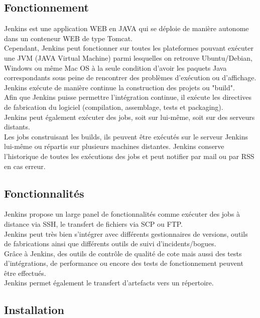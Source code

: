 \documentclass[12pt]{article}
\begin{document}
\subsection{Fonctionnement}

Jenkins est une application WEB en JAVA qui se déploie de manière autonome dans un conteneur WEB de type Tomcat.
\\
Cependant, Jenkins peut fonctionner sur toutes les plateformes pouvant exécuter une JVM (JAVA Virtual Machine) parmi lesquelles on retrouve Ubuntu/Debian, Windows ou même Mac OS à la seule condition d'avoir les paquets Java correspondants sous peine de rencontrer des problèmes d'exécution ou d'affichage.
\\
Jenkins exécute de manière continue la construction des projets ou "build".
\\ 
Afin que Jenkins puisse permettre l'intégration continue, il exécute les directives de fabrication du logiciel (compilation, assemblage, tests et packaging).
\\
Jenkins peut également exécuter des jobs, soit sur lui-même, soit sur des serveurs distants.
\\
Les jobs construisant les builds, ils peuvent être exécutés sur le serveur Jenkins lui-même ou répartis sur plusieurs machines distantes. Jenkins conserve l'historique de toutes les exécutions des jobs et peut notifier par mail ou par RSS en cas erreur.

\subsection{Fonctionnalités}
Jenkins propose un large panel de fonctionnalités comme exécuter des jobs à distance via SSH, le transfert de fichiers via SCP ou FTP. 
\\
Jenkins peut très bien s'intégrer avec différents gestionnaires de versions, outils de fabrications ainsi que différents outils de suivi d'incidents/bogues. 
\\
Grâce à Jenkins, des outils de contrôle de qualité de cote mais aussi des tests d'intégrations, de performance ou encore des tests de fonctionnement peuvent être effectués.
\\
Jenkins permet également le transfert d'artefacts vers un répertoire.

\subsection{Installation}
\end{document}
